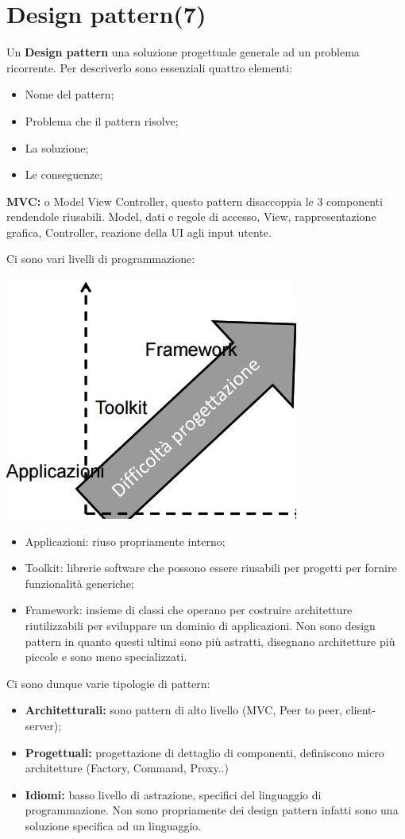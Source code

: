 



\section{Design pattern(7)}

Un \textbf{Design pattern} una soluzione progettuale generale ad un problema ricorrente. Per descriverlo sono essenziali quattro elementi:
\begin{itemize}
	\item Nome del pattern;
	\item Problema che il pattern risolve;
	\item La soluzione;
	\item Le conseguenze;
\end{itemize}

\textbf{MVC:} o Model View Controller, questo pattern disaccoppia le 3 componenti rendendole riusabili. Model, dati e regole di accesso, View, rappresentazione grafica, Controller, reazione della UI agli input utente.

Ci sono vari livelli di programmazione:

\includegraphics[width=0.3\columnwidth]{img1}
\begin{itemize}
	\item Applicazioni: riuso propriamente interno;
	\item Toolkit: librerie software che possono essere riusabili per progetti per fornire funzionalità generiche;
	\item Framework: insieme di classi che operano per costruire architetture riutilizzabili per sviluppare un dominio di applicazioni. Non sono design pattern in quanto questi ultimi sono più astratti, disegnano architetture più piccole e sono meno specializzati.
\end{itemize}

Ci sono dunque varie tipologie di pattern:
\begin{itemize}
	\item \textbf{Architetturali:} sono pattern di alto livello (MVC, Peer to peer, client-server);
	\item \textbf{Progettuali:} progettazione di dettaglio di componenti, definiscono micro architetture (Factory, Command, Proxy..)
	\item \textbf{Idiomi:} basso livello di astrazione, specifici del linguaggio di programmazione. Non sono propriamente dei design pattern infatti sono una soluzione specifica ad un linguaggio.
\end{itemize}
